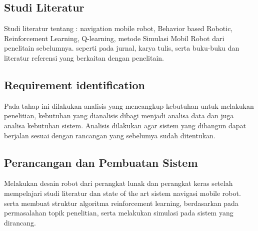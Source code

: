 
\subsection{Studi Literatur}
Studi literatur tentang :
navigation mobile robot, Behavior based Robotic,  Reinforcement Learning, 
Q-learning, metode Simulasi Mobil Robot dari penelitain sebelumnya.
seperti pada jurnal, karya tulis, serta buku-buku dan literatur referensi yang berkaitan dengan penelitain.

\subsection{Requirement identification}

Pada tahap ini dilakukan analisis yang mencangkup kebutuhan untuk melakukan penelitian, 
kebutuhan yang dianalisis dibagi menjadi analisa data dan juga analisa kebutuhan sistem. 
Analisis dilakukan agar sistem yang dibangun dapat berjalan sesuai dengan rancangan yang sebelumya sudah ditentukan.

\subsection{Perancangan dan Pembuatan Sistem}
Melakukan desain robot dari perangkat lunak dan perangkat keras setelah mempelajari studi literatur dan state of the art
sistem navigasi mobile robot. serta membuat struktur algoritma reinforcement learning, 
berdasarkan pada permasalahan topik penelitian, serta melakukan simulasi pada sistem 
yang dirancang.

